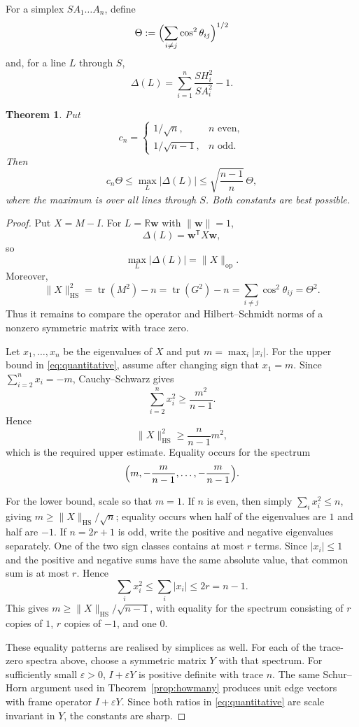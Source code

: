 \documentclass[11pt]{article}
\newtheorem{theorem}{Theorem}[section]
\theoremstyle{definition}
\theoremstyle{remark}
\DeclareMathOperator{\tr}{tr}
\newcommand{\HS}{\mathrm{HS}}
\newcommand{\T}{\mathsf{T}}
\newcommand{\R}{\mathbb{R}}
\newcommand{\bw}{\mathbf w}
\newcommand{\norm}[1]{\lVert #1 \rVert}
\begin{document}
For a simplex $SA_1\ldots A_n$, define
\[
\Theta:=\Bigl(\sum_{i\ne j}\cos^2\theta_{ij}\Bigr)^{1/2}
\]
and, for a line $L$ through $S$,
\[
\Delta(L)=\sum_{i=1}^{n}\frac{SH_i^2}{SA_i^2}-1.
\]

\begin{theorem}\label{thm:quantitative}
Put
\[
c_n=
\begin{cases}
1/\sqrt n,& n\text{ even},\\[2pt]
1/\sqrt{n-1},& n\text{ odd}.
\end{cases}
\]
Then
\begin{equation}\label{eq:quantitative}
c_n\Theta
\le
\max_L|\Delta(L)|
\le
\sqrt{\frac{n-1}{n}}\,\Theta,
\end{equation}
where the maximum is over all lines through $S$. Both constants are best possible.
\end{theorem}

\begin{proof}
Put $X=M-I$. For $L=\R\bw$ with $\norm\bw=1$,
\[
\Delta(L)=\bw^{\T}X\bw,
\]
so
\[
\max_L|\Delta(L)|=\norm{X}_{\mathrm{op}}.
\]
Moreover,
\[
\norm{X}_{\HS}^2
=
\tr(M^2)-n
=
\tr(G^2)-n
=
\sum_{i\ne j}\cos^2\theta_{ij}
=
\Theta^2.
\]
Thus it remains to compare the operator and Hilbert--Schmidt norms of a nonzero symmetric
matrix with trace zero.

Let $x_1,\ldots,x_n$ be the eigenvalues of $X$ and put
$m=\max_i|x_i|$. For the upper bound in \eqref{eq:quantitative}, assume after changing
sign that $x_1=m$. Since $\sum_{i=2}^{n}x_i=-m$, Cauchy--Schwarz gives
\[
\sum_{i=2}^{n}x_i^2\ge\frac{m^2}{n-1}.
\]
Hence
\[
\norm{X}_{\HS}^2\ge\frac{n}{n-1}m^2,
\]
which is the required upper estimate. Equality occurs for the spectrum
\[
\Bigl(m,-\frac{m}{n-1},\ldots,-\frac{m}{n-1}\Bigr).
\]

For the lower bound, scale so that $m=1$. If $n$ is even, then simply
$\sum_i x_i^2\le n$, giving $m\ge\norm{X}_{\HS}/\sqrt n$; equality occurs when half of the
eigenvalues are $1$ and half are $-1$. If $n=2r+1$ is odd, write the positive and negative eigenvalues separately. One of the two
sign classes contains at most $r$ terms. Since $|x_i|\le1$ and the positive and negative
sums have the same absolute value, that common sum is at most $r$. Hence
\[
\sum_i x_i^2\le\sum_i|x_i|\le2r=n-1.
\]
This gives $m\ge\norm{X}_{\HS}/\sqrt{n-1}$, with equality for the spectrum consisting of
$r$ copies of $1$, $r$ copies of $-1$, and one $0$.

These equality patterns are realised by simplices as well. For each of
the trace-zero spectra above, choose a symmetric matrix $Y$ with that spectrum. For
sufficiently small $\varepsilon>0$, $I+\varepsilon Y$ is positive definite with trace $n$.
The same Schur--Horn argument used in Theorem~\ref{prop:howmany} produces unit edge vectors
with frame operator $I+\varepsilon Y$. Since both ratios in \eqref{eq:quantitative} are
scale invariant in $Y$, the constants are sharp.
\end{proof}
\end{document}
